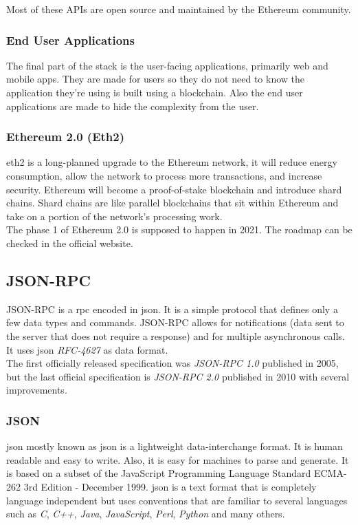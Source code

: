\documentclass[a4paper, 12pt]{article} %
\begin{document}
            Most of these APIs are open source and maintained by the Ethereum community.

        \subsubsection{End User Applications}
            The final part of the stack is the user-facing applications, primarily web and mobile apps.  They are made for users so they do not need to know the application they're using is built using a blockchain. Also the end user applications are made to hide the complexity from the user.
            
        \subsubsection{Ethereum 2.0 (Eth2)}
            \acrshort{eth2}\cite{eth2} is a long-planned upgrade to the Ethereum network, it will reduce energy consumption, allow the network to process more transactions, and increase security.  Ethereum will become a proof-of-stake blockchain and introduce shard chains. Shard chains are like parallel blockchains that sit within Ethereum and take on a portion of the network's processing work.\\
            
            The phase 1 of Ethereum 2.0 is supposed to happen in 2021. The roadmap can be checked in the official website\cite{eth2Roadmap}.
            

    \subsection{JSON-RPC}
        JSON-RPC is a \acrfull{rpc} encoded in \acrshort{json}. It is a simple protocol that defines only a few data types and commands. JSON-RPC allows for notifications (data sent to the server that does not require a response) and for multiple asynchronous calls. It uses \acrshort{json} \textit{RFC-4627}\cite{rfc4627} as data format.\\
        
        The first officially released specification was \textit{JSON-RPC 1.0}\cite{json-rpc-1} published in 2005, but the last official specification is \textit{JSON-RPC 2.0}\cite{json-rpc-2} published in 2010 with several improvements.
        
        \subsubsection{JSON}
            \acrlong{json} mostly known as \acrshort{json} is a lightweight data-interchange format. It is human readable and easy to write. Also, it is easy for machines to parse and generate. It is based on a subset of the JavaScript Programming Language Standard ECMA-262 3rd Edition - December 1999. \acrshort{json} is a text format that is completely language independent but uses conventions that are familiar to several languages such as \textit{C}, \textit{C++}, \textit{Java}, \textit{JavaScript}, \textit{Perl}, \textit{Python} and many others.\\
                        
\end{document}
